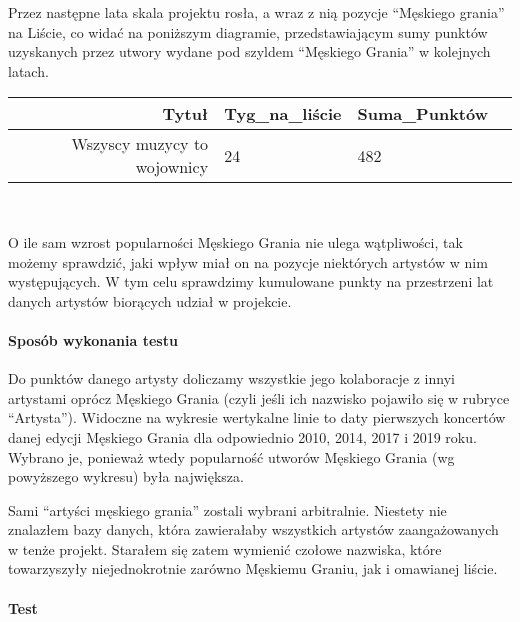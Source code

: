 \documentclass[11pt]{article}
\begin{document}
Przez następne lata skala projektu rosła, a wraz z nią pozycje
``Męskiego grania'' na Liście, co widać na poniższym diagramie,
przedstawiającym sumy punktów uzyskanych przez utwory wydane pod szyldem
``Męskiego Grania'' w kolejnych latach.

    \begin{tabular}{r|lll}
 Tytuł & Tyg\_na\_liście & Suma\_Punktów\\
\hline
	 Wszyscy muzycy to wojownicy & 24                          & 482                        \\
\end{tabular}


    
    \begin{center}
    \end{center}
    { \hspace*{\fill} \\}
    
    O ile sam wzrost popularności Męskiego Grania nie ulega wątpliwości, tak
możemy sprawdzić, jaki wpływ miał on na pozycje niektórych artystów w
nim występujących. W tym celu sprawdzimy kumulowane punkty na
przestrzeni lat danych artystów biorących udział w projekcie.

\hypertarget{sposuxf3b-wykonania-testu}{%
\paragraph{Sposób wykonania testu}\label{sposuxf3b-wykonania-testu}}

Do punktów danego artysty doliczamy wszystkie jego kolaboracje z innyi
artystami oprócz Męskiego Grania (czyli jeśli ich nazwisko pojawiło się
w rubryce ``Artysta''). Widoczne na wykresie wertykalne linie to daty
pierwszych koncertów danej edycji Męskiego Grania dla odpowiednio 2010,
2014, 2017 i 2019 roku. Wybrano je, ponieważ wtedy popularność utworów
Męskiego Grania (wg powyższego wykresu) była największa.

Sami ``artyści męskiego grania'' zostali wybrani arbitralnie. Niestety
nie znalazłem bazy danych, która zawierałaby wszystkich artystów
zaangażowanych w tenże projekt. Starałem się zatem wymienić czołowe
nazwiska, które towarzyszyły niejednokrotnie zarówno Męskiemu Graniu,
jak i omawianej liście.

\hypertarget{test}{%
\paragraph{Test}\label{test}}
\end{document}
